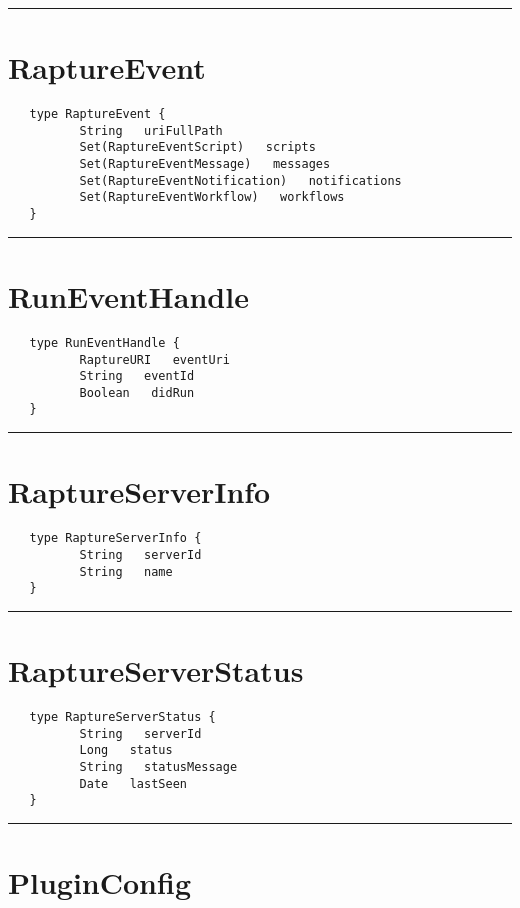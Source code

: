 \rule{12cm}{2pt}
\section{RaptureEvent}
\label{type:RaptureEvent}

\begin{Verbatim}
   type RaptureEvent {
          String   uriFullPath
          Set(RaptureEventScript)   scripts
          Set(RaptureEventMessage)   messages
          Set(RaptureEventNotification)   notifications
          Set(RaptureEventWorkflow)   workflows
   }
\end{Verbatim}

\rule{12cm}{2pt}
\section{RunEventHandle}
\label{type:RunEventHandle}

\begin{Verbatim}
   type RunEventHandle {
          RaptureURI   eventUri
          String   eventId
          Boolean   didRun
   }
\end{Verbatim}

\rule{12cm}{2pt}
\section{RaptureServerInfo}
\label{type:RaptureServerInfo}

\begin{Verbatim}
   type RaptureServerInfo {
          String   serverId
          String   name
   }
\end{Verbatim}

\rule{12cm}{2pt}
\section{RaptureServerStatus}
\label{type:RaptureServerStatus}

\begin{Verbatim}
   type RaptureServerStatus {
          String   serverId
          Long   status
          String   statusMessage
          Date   lastSeen
   }
\end{Verbatim}

\rule{12cm}{2pt}
\section{PluginConfig}
\label{type:PluginConfig}


